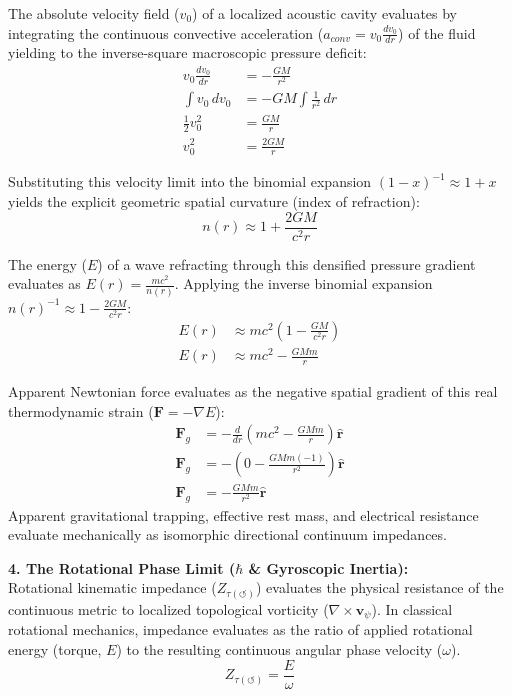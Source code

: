 \documentclass[11pt, a4paper]{article}
\begin{document}
The absolute velocity field ($v_0$) of a localized acoustic cavity evaluates by integrating the continuous convective acceleration ($a_{conv} = v_0 \frac{dv_0}{dr}$) of the fluid yielding to the inverse-square macroscopic pressure deficit:
\begin{align}
    v_0 \frac{dv_0}{dr} &= -\frac{GM}{r^2}  \\
    \int v_0 \, dv_0 &= -GM \int \frac{1}{r^2} \, dr  \\
    \frac{1}{2}v_0^2 &= \frac{GM}{r}  \\
    v_0^2 &= \frac{2GM}{r} 
\end{align}

Substituting this velocity limit into the binomial expansion $(1-x)^{-1} \approx 1+x$ yields the explicit geometric spatial curvature (index of refraction):
\begin{equation}
    n(r) \approx 1 + \frac{2GM}{c^2 r} 
\end{equation}

The energy ($E$) of a wave refracting through this densified pressure gradient evaluates as $E(r) = \frac{mc^2}{n(r)}$. Applying the inverse binomial expansion $n(r)^{-1} \approx 1 - \frac{2GM}{c^2 r}$:
\begin{align}
    E(r) &\approx mc^2 \left( 1 - \frac{GM}{c^2 r} \right)  \\
    E(r) &\approx mc^2 - \frac{GMm}{r} 
\end{align}

Apparent Newtonian force evaluates as the negative spatial gradient of this real thermodynamic strain ($\mathbf{F} = -\nabla E$):
\begin{align}
    \mathbf{F}_g &= -\frac{d}{dr} \left( mc^2 - \frac{GMm}{r} \right) \mathbf{\hat{r}}  \\
    \mathbf{F}_g &= -\left( 0 - \frac{GMm (-1)}{r^2} \right) \mathbf{\hat{r}}  \\
    \mathbf{F}_g &= -\frac{GMm}{r^2} \mathbf{\hat{r}} 
\end{align}
Apparent gravitational trapping, effective rest mass, and electrical resistance evaluate mechanically as isomorphic directional continuum impedances.

\textbf{4. The Rotational Phase Limit ($\hbar$ \& Gyroscopic Inertia):} \\
Rotational kinematic impedance ($Z_{\tau(\circlearrowleft)}$) evaluates the physical resistance of the continuous metric to localized topological vorticity ($\nabla \times \mathbf{v}_{\psi}$). In classical rotational mechanics, impedance evaluates as the ratio of applied rotational energy (torque, $E$) to the resulting continuous angular phase velocity ($\omega$).
\begin{equation}
    Z_{\tau(\circlearrowleft)} = \frac{E}{\omega}
\end{equation}
\end{document}
